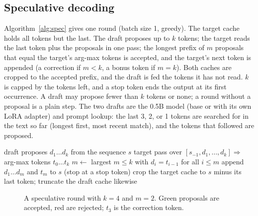 \documentclass[conference]{IEEEtran}
\begin{document}
\subsection{Speculative decoding}
Algorithm~\ref{alg:spec} gives one round (batch size 1, greedy). The target cache holds all tokens but the last. The draft proposes up to $k$ tokens; the target reads the last token plus the proposals in one pass; the longest prefix of $m$ proposals that equal the target's arg-max tokens is accepted, and the target's next token is appended (a correction if $m<k$, a bonus token if $m=k$). Both caches are cropped to the accepted prefix, and the draft is fed the tokens it has not read. $k$ is capped by the tokens left, and a stop token ends the output at its first occurrence. A draft may propose fewer than $k$ tokens or none; a round without a proposal is a plain step. The two drafts are the 0.5B model (base or with its own LoRA adapter) and prompt lookup: the last 3, 2, or 1 tokens are searched for in the text so far (longest first, most recent match), and the tokens that followed are proposed.

\begin{algorithm}[t]
\caption{One greedy speculative round}
\label{alg:spec}
\begin{algorithmic}[1]
\STATE draft proposes $d_1\ldots d_k$ from the sequence $s$
\STATE target pass over $[s_{-1},d_1,\ldots,d_k]\Rightarrow$ arg-max tokens $t_0\ldots t_k$
\STATE $m\gets$ largest $m\le k$ with $d_i=t_{i-1}$ for all $i\le m$
\STATE append $d_1\ldots d_m$ and $t_m$ to $s$ (stop at a stop token)
\STATE crop the target cache to $s$ minus its last token; truncate the draft cache likewise
\end{algorithmic}
\end{algorithm}

\begin{figure}[t]
\centering
{}
\caption{A speculative round with $k=4$ and $m=2$. Green proposals are accepted, red are rejected; $t_3$ is the correction token.}
\label{fig:specround}
\end{figure}
\end{document}
